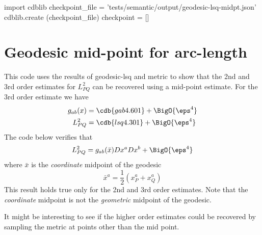 \documentclass[12pt]{cdblatex}
\begin{document}

\bgroup
{}
\begin{cadabra}
   import cdblib
   checkpoint_file = 'tests/semantic/output/geodesic-lsq-midpt.json'
   cdblib.create (checkpoint_file)
   checkpoint = []
\end{cadabra}
\egroup

\section*{Geodesic mid-point for arc-length}




This code uses the results of {\tts geodesic-lsq} and {\tts metric} to show that the 2nd and 3rd
order estimates for $L^2_{PQ}$ can be recovered using a mid-point estimate. For the 3rd order estimate
we have
\begin{align*}
   g_{ab}(x) &= \cdb{gab4.601} + \BigO{\eps^4}\\
   L^2_{PQ}  &= \cdb{lsq4.301} + \BigO{\eps^4}
\end{align*}
The code below verifies that
\begin{equation*}
   L^2_{PQ} = g_{ab}(\bar x) Dx^{a} Dx^{b} + \BigO{\eps^4}
\end{equation*}
where $\bar x$ is the \emph{coordinate} midpoint of the geodesic
\begin{equation*}
   {\bar x^a} = \frac{1}{2}\left(x^{a}_{P} + x^{a}_{Q}\right)
\end{equation*}
This result holds true only for the 2nd and 3rd order estimates. Note that the \emph{coordinate} midpoint
is not the \emph{geometric} midpoint of the geodesic.

It might be interesting to see if the higher order estimates could
be recovered by sampling the metric at points other than the mid point.

\clearpage
\end{document}

